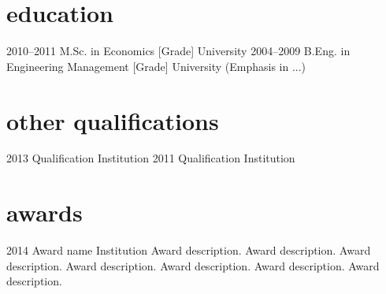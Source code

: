 \documentclass{article}
\begin{document}
\section{education}

\begin{entrylist}
\entry
{2010--2011}
{M.Sc. {\normalfont in Economics [Grade]}}
{University}
{\vspace{-0.3cm}}
\entry
{2004--2009}
{B.Eng. {\normalfont in Engineering Management [Grade]}}
{University}
{(Emphasis in ...)}
\end{entrylist}


\section{other qualifications}

\begin{entrylist}
\entry
{2013}
{Qualification}
{Institution}
{\vspace{-0.3cm}}
\entry
{2011}
{Qualification}
{Institution}
{\vspace{-0.3cm}}
\end{entrylist}


\section{awards}

\begin{entrylist}
\entry
{2014}
{Award name}
{Institution}
{Award description. Award description. Award description. Award description. Award description. Award description. Award description. }
\end{entrylist}
\end{document}
